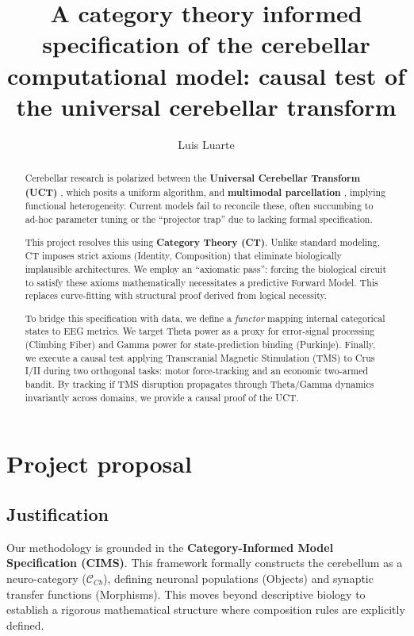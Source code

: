 \documentclass{article}
\title{A category theory informed specification of the cerebellar computational model: causal test of the universal cerebellar transform}
\author{Luis Luarte}
\begin{document}
	\maketitle
	\begin{abstract}
		Cerebellar research is polarized between the \textbf{Universal Cerebellar Transform (UCT)} \cite{itoMovementThoughtIdentical1993}, which posits a uniform algorithm, and \textbf{multimodal parcellation} \cite{diedrichsenUniversalTransformMultiple2019}, implying functional heterogeneity. Current models fail to reconcile these, often succumbing to ad-hoc parameter tuning or the ``projector trap'' due to lacking formal specification.
		
		This project resolves this using \textbf{Category Theory (CT)}. Unlike standard modeling, CT imposes strict axioms (Identity, Composition) that eliminate biologically implausible architectures. We employ an ``axiomatic pass'': forcing the biological circuit to satisfy these axioms mathematically necessitates a predictive Forward Model. This replaces curve-fitting with structural proof derived from logical necessity.
		
		To bridge this specification with data, we define a \textit{functor} mapping internal categorical states to EEG metrics. We target Theta power as a proxy for error-signal processing (Climbing Fiber) and Gamma power for state-prediction binding (Purkinje). Finally, we execute a causal test applying Transcranial Magnetic Stimulation (TMS) to Crus I/II during two orthogonal tasks: motor force-tracking and an economic two-armed bandit. By tracking if TMS disruption propagates through Theta/Gamma dynamics invariantly across domains, we provide a causal proof of the UCT.
	\end{abstract}
	
	\section{Project proposal}
	\subsection{Justification}
	Our methodology is grounded in the \textbf{Category-Informed Model Specification (CIMS)}. This framework formally constructs the cerebellum as a neuro-category ($\mathcal{C}_{Cb}$), defining neuronal populations (Objects) and synaptic transfer functions (Morphisms). This moves beyond descriptive biology to establish a rigorous mathematical structure where composition rules are explicitly defined.
	
\end{document}

